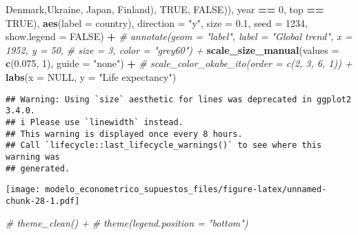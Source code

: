 \documentclass[
]{article}
\newenvironment{Shaded}{\begin{snugshade}}{\end{snugshade}}
\newcommand{\AttributeTok}[1]{\textcolor[rgb]{0.13,0.29,0.53}{#1}}
\newcommand{\CommentTok}[1]{\textcolor[rgb]{0.56,0.35,0.01}{\textit{#1}}}
\newcommand{\ConstantTok}[1]{\textcolor[rgb]{0.56,0.35,0.01}{#1}}
\newcommand{\DecValTok}[1]{\textcolor[rgb]{0.00,0.00,0.81}{#1}}
\newcommand{\FloatTok}[1]{\textcolor[rgb]{0.00,0.00,0.81}{#1}}
\newcommand{\FunctionTok}[1]{\textcolor[rgb]{0.13,0.29,0.53}{\textbf{#1}}}
\newcommand{\NormalTok}[1]{#1}
\newcommand{\SpecialCharTok}[1]{\textcolor[rgb]{0.81,0.36,0.00}{\textbf{#1}}}
\newcommand{\StringTok}[1]{\textcolor[rgb]{0.31,0.60,0.02}{#1}}
\begin{document}
\begin{Shaded}
\begin{Highlighting}[]
                                       \StringTok{\textquotesingle{}Denmark\textquotesingle{}}\NormalTok{,}\StringTok{\textquotesingle{}Ukraine\textquotesingle{}}\NormalTok{, }\StringTok{\textquotesingle{}Japan\textquotesingle{}}\NormalTok{, }\StringTok{\textquotesingle{}Finland\textquotesingle{}}\NormalTok{), }\ConstantTok{TRUE}\NormalTok{, }\ConstantTok{FALSE}\NormalTok{)),}
\NormalTok{                                 year }\SpecialCharTok{==} \DecValTok{0}\NormalTok{, top }\SpecialCharTok{==} \ConstantTok{TRUE}\NormalTok{),}
                   \FunctionTok{aes}\NormalTok{(}\AttributeTok{label =}\NormalTok{ country), }\AttributeTok{direction =} \StringTok{"y"}\NormalTok{, }\AttributeTok{size =} \FloatTok{0.1}\NormalTok{, }\AttributeTok{seed =} \DecValTok{1234}\NormalTok{,}
                   \AttributeTok{show.legend =} \ConstantTok{FALSE}\NormalTok{) }\SpecialCharTok{+}
  \CommentTok{\# annotate(geom = "label", label = "Global trend", x = 1952, y = 50,}
  \CommentTok{\#          size = 3, color = "grey60") +}
  \FunctionTok{scale\_size\_manual}\NormalTok{(}\AttributeTok{values =} \FunctionTok{c}\NormalTok{(}\FloatTok{0.075}\NormalTok{, }\DecValTok{1}\NormalTok{), }\AttributeTok{guide =} \StringTok{"none"}\NormalTok{) }\SpecialCharTok{+}
  \CommentTok{\# scale\_color\_okabe\_ito(order = c(2, 3, 6, 1)) +}
  \FunctionTok{labs}\NormalTok{(}\AttributeTok{x =} \ConstantTok{NULL}\NormalTok{, }\AttributeTok{y =} \StringTok{"Life expectancy"}\NormalTok{) }
\end{Highlighting}
\end{Shaded}

\begin{verbatim}
## Warning: Using `size` aesthetic for lines was deprecated in ggplot2 3.4.0.
## i Please use `linewidth` instead.
## This warning is displayed once every 8 hours.
## Call `lifecycle::last_lifecycle_warnings()` to see where this warning was
## generated.
\end{verbatim}

\texttt{[image: modelo\_econometrico\_supuestos\_files/figure-latex/unnamed-chunk-28-1.pdf]}

\begin{Shaded}
\begin{Highlighting}[]
  \CommentTok{\# theme\_clean() +}
  \CommentTok{\# theme(legend.position = "bottom")}
\end{Highlighting}
\end{Shaded}
\end{document}
